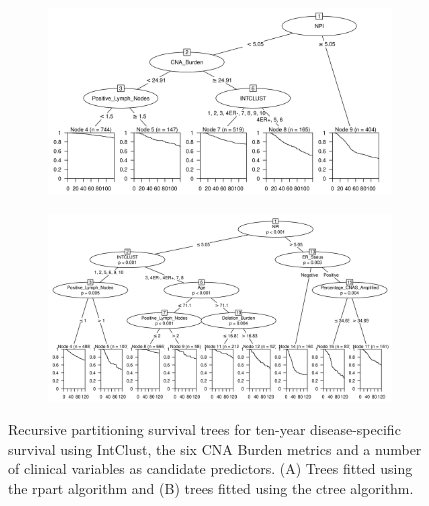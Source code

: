 \begin{figure}[!h]
\centering

\vspace{1cm}

\begin{subfigure}{\textwidth}
\subcaption{}
\includegraphics[width=1\textwidth]{../figures/Chapter_3/Clin_PartyKit_Survival_Burden_TenYearDSS_INTCLUST.png}
\end{subfigure}

\vspace{3cm}

\begin{subfigure}{\textwidth}
\subcaption{}
\includegraphics[width=1\textwidth]{../figures/Chapter_3/Clin_Ctree_Survival_Burden_TenYearDSS_INTCLUST.png}
\end{subfigure}

\vspace{1cm}

\caption[Recursive partitioning survival trees for ten-year disease-specific survival using IntClust, the six CNA Burden metrics and a number of clinical variables as candidate predictors.]{Recursive partitioning survival trees for ten-year disease-specific survival using IntClust, the six CNA Burden metrics and a number of clinical variables as candidate predictors. (A) Trees fitted using the rpart algorithm and (B) trees fitted using the ctree algorithm.}
\label{fig:INTCLUST_CNA_Burden_TenYearDSS_Clin}
\end{figure}

